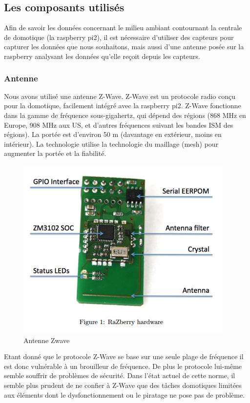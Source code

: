 \subsection{Les composants utilisés}
Afin de savoir les données concernant le milieu ambiant contournant la centrale de domotique (la raspberry pi2), il est nécessaire d'utiliser des capteurs pour capturer les données que nous souhaitons, mais aussi d'une antenne posée sur la raspberry analysant les données qu'elle reçoit depuis les capteurs.

\subsubsection{Antenne}
Nous avons utilisé une antenne Z-Wave. Z-Wave est un protocole radio conçu pour la domotique, facilement intégré avec la raspberry pi2. Z-Wave fonctionne dans la gamme de fréquence sous-gigahertz, qui dépend des régions (868 MHz en Europe, 908 MHz aux US, et d'autres fréquences suivant les bandes ISM des régions). La portée est d'environ 50 m (davantage en extérieur, moins en intérieur). La technologie utilise la technologie du maillage (mesh) pour augmenter la portée et la fiabilité.

\begin{figure}[h]
	\center
	\includegraphics[scale=0.5]{./Images/png/Zwave.png}\newline
	\caption{Antenne Zwave}
\end{figure}

Etant donné que le protocole Z-Wave se base sur une seule plage de fréquence il est donc vulnérable à un brouilleur de fréquence.
 De plus le protocole lui-même semble souffrir de problèmes de sécurité. Dans l'état actuel de cette norme, il semble plus prudent de ne confier à Z-Wave que des tâches domotiques limitées aux éléments dont le dysfonctionnement ou le piratage ne pose pas de problème.
